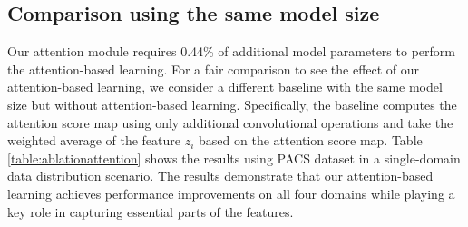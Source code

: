 \documentclass{article}
\theoremstyle{plain}
\theoremstyle{definition}
\theoremstyle{remark}
\begin{document}
%
%
%		



\subsection{Comparison using the same model size}
Our attention module requires 0.44\% of additional model parameters to perform the attention-based learning. For a fair comparison to see the effect of our attention-based learning, we consider a different baseline with the same model size but without attention-based learning. Specifically, the baseline computes the attention score map using only additional convolutional operations and take the weighted average of the feature $z_i$ based on the attention score map. Table \ref{table:ablationattention} shows the results using PACS dataset in a single-domain data distribution scenario. The results demonstrate that our attention-based learning achieves performance improvements on all four domains while playing a key role in capturing essential parts of the features.
\end{document}
